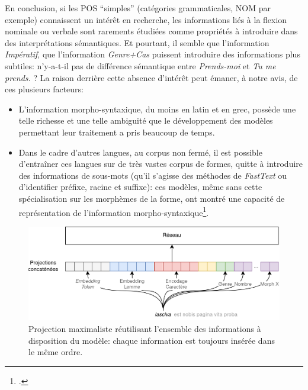 En conclusion, si les POS \enquote{simples} (catégories grammaticales, NOM par exemple) connaissent un intérêt en recherche, les informations liés à la flexion nominale ou verbale sont rarements étudiées comme propriétés à introduire dans des interprétations sémantiques. Et pourtant, il semble que l'information \textit{Impératif}, que l'information \textit{Genre+Cas} puissent introduire des informations plus subtiles: n'y-a-t-il pas de différence sémantique entre \textit{Prends-moi} et \textit{Tu me prends.} ? La raison derrière cette absence d'intérêt peut émaner, à notre avis, de ces plusieurs facteurs:
\begin{itemize}
    \item L'information morpho-syntaxique, du moins en latin et en grec, possède une telle richesse et une telle ambiguité que le développement des modèles permettant leur traitement a pris beaucoup de temps.
    \item Dans le cadre d'autres langues, au corpus non fermé, il est possible d'entraîner ces langues sur de très vastes corpus de formes, quitte à introduire des informations de sous-mots (qu'il s'agisse des méthodes de \textit{FastText} ou d'identifier préfixe, racine et suffixe): ces modèles, même sans cette spécialisation sur les morphèmes de la forme, ont montré une capacité de représentation de l'information morpho-syntaxique\footcite{qian_investigating_2016}.%
    
\end{itemize}


\begin{figure}
    \centering
    \includegraphics[width=\linewidth]{figures/chap4/Projection.drawio.png}
    \caption{Projection maximaliste réutilisant l'ensemble des informations à disposition du modèle: chaque information est toujours insérée dans le même ordre.}
    \label{fig:chap4:projection:morphosyntax}
\end{figure}

